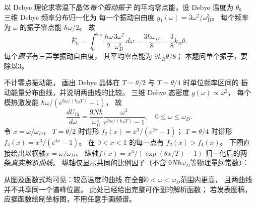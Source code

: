 以 Debye 理论求零温下晶体\emph{每个振动振子}
的平均零点能，设 Debye 温度为 $\theta$。
\exsolution
三维 Debye 频率分布归一化为
每一个振动自由度
$g_1(\omega)=3\omega^2/\omega_D^3$。
每个频率为 $\omega$ 的振子零点能 $\hbar\omega/2$。
故
\[
 \overline E_0=
 \int_0^{\omega_D}\frac{\hbar\omega}{2}
 \frac{3\omega^2}{\omega_D^3}\,d\omega
 =\frac{3\hbar\omega_D}{8}
 =\boxed{\frac38k_B\theta}.
\]
\excheck 每个\emph{原子}有三声学振动自由度，
其平均零点能为 $9k_B\theta/8$；
本题问单个振子，要除以3。

不计零点振动能，
画出 Debye 晶体在 $T=\theta/2$
与 $T=\theta/4$ 时单位频率区间的
振动能量分布曲线，并说明两曲线的比较。
\exsolution
三维 Debye 态密度
$g(\omega)\propto\omega^2$，
每个模热激发能
$\hbar\omega/(e^{\hbar\omega/(k_BT)}-1)$，
故
\[
 \boxed{\frac{dU_{\mathrm{th}}}{d\omega}
 =\frac{9N\hbar}{\omega_D^3}
 \frac{\omega^3}{e^{\hbar\omega/(k_BT)}-1}},
 \quad 0\le\omega\le\omega_D.
\]
令 $x=\omega/\omega_D$，
$T=\theta/2$ 时谱形
$f_2(x)=x^3/(e^{2x}-1)$；
$T=\theta/4$ 时谱形
$f_4(x)=x^3/(e^{4x}-1)$。
在 $0<x<1$ 的每一点有
$f_2(x)>f_4(x)$。
下图直接绘出以横轴$x=\omega/\omega_D$、
纵轴$f(x)=x^3/(\exp(\theta x/T)-1)$
归一化后的两条\emph{真实解析曲线}。
纵轴仅显示共同的比例因子（不含
$9N\hbar\omega_D$等物理量纲常数）：
\begin{center}
\end{center}
从图及函数式均可见：较高温度的曲线
在全部$0<\omega<\omega_D$范围内更高，
且两曲线并不共享同一个谱峰位置。
\excheck 此处已经给出完整可作图的解析函数；
若发表图稿，应据函数绘制坐标图，不用任意手画频谱。

